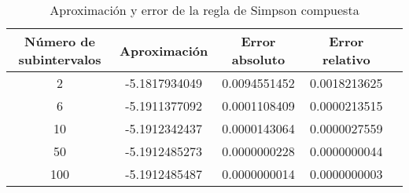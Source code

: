 \begin{table}[h]
  \begin{center}
    \begin{tabular}{|c|c|c|c|c|} \hline 
      \textbf{N\'umero de subintervalos} & \textbf{Aproximaci\'on} & \textbf{Error absoluto} & \textbf{Error relativo}\\ 
      \hline
      2 & -5.1817934049 & 0.0094551452 & 0.0018213625
      \\
      \hline
      6 & -5.1911377092 & 0.0001108409 & 0.0000213515
      \\
      \hline
      10 & -5.1912342437 & 0.0000143064 & 0.0000027559
      \\
      \hline
      50 & -5.1912485273 & 0.0000000228 & 0.0000000044
      \\
      \hline
      100 & -5.1912485487 & 0.0000000014 & 0.0000000003
      \\
      \hline
    \end{tabular}
  \end{center}
  \caption{Aproximaci\'on y error de la regla de Simpson compuesta}
  \label{tab:2}
\end{table}


